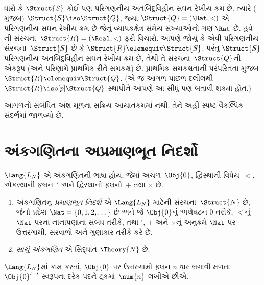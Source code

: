 \begin{rem}
  ધારો કે $\Struct{S}$ કોઈ પણ પરિગણનીય અંતબિંદુવિહીન સઘન રેખીય
  ક્રમ છે. ત્યારે ( મુજબ) $\Struct{S} \iso
  \Struct{Q}$, જ્યાં $\Struct{Q} = (\Rat, <)$ એ પરિગણનીય સઘન
  રેખીય ક્રમ છે જેનું વ્યાપકક્ષેત્ર સંમેય સંખ્યાઓનો ગણ $\Rat$ છે. હવે
  ની સંરચના~$\Struct{R} = (\Real, <)$ ફરી
  વિચારો. આપણે જોયું કે એવી પરિગણનીય સંરચના~$\Struct{S}$
  છે કે $\Struct{R} \elemequiv \Struct{S}$. પરંતુ $\Struct{S}$
  પરિગણનીય અંતબિંદુવિહીન સઘન રેખીય ક્રમ છે, તેથી તે
  સંરચના~$\Struct{Q}$ની એકરૂપ (અને પરિણામે પ્રાથમિક રીતે સમકક્ષ)
  છે. પ્રાથમિક સમકક્ષતાની પરંપરિતતા મુજબ $\Struct{R} \elemequiv
  \Struct{Q}$. (એ જ આગળ-પાછળ દલીલથી $\Struct{R} \iso[p]
  \Struct{Q}$ સ્થાપીને આપણે આ સીધું પણ બતાવી શક્યા હોત.)
\end{rem}
\endgroup



\OLEndChapterHook


\begin{editorial}
આગળનો સંબંધિત અંશ મૂળના સક્રિય આયાતક્રમમાં નથી. તેને અહીં સ્પષ્ટ વૈકલ્પિક સંદર્ભમાં જાળવ્યો છે.
\end{editorial}
\begingroup
\makeatletter{}\makeatother

\section{અંકગણિતના અપ્રમાણભૂત નિદર્શો}
\label{guunit:OLP-0653}


\begin{defn}
$\Lang{L_N}$ એ અંકગણિતની ભાષા હોય,
જેમાં અચળ~$\Obj{0}$, દ્વિસ્થાની
વિધેય~$<$, એકસ્થાની ફલન~$\prime$
અને દ્વિસ્થાની ફલનો~$+$ તથા $\times$
છે.
\begin{enumerate}
\item અંકગણિતનું \emph{પ્રમાણભૂત નિદર્શ}
  એ $\Lang{L_N}$ માટેની સંરચના~$\Struct{N}$
  છે, જેનો પ્રદેશ
  $\Nat = \{ 0, 1, 2, \dots\}$ છે અને જે
  $\Obj{0}$નું અર્થઘટન $0$ તરીકે, $<$નું
  $\Nat$ પરના નાનાપણાના સંબંધ તરીકે,
  તથા $\prime$, $+$ અને $\times$નું
  અનુક્રમે $\Nat$ પર ઉત્તરગામી,
  સરવાળો અને ગુણાકાર તરીકે કરે છે.
\item \emph{સાચું અંકગણિત} એ
  સિદ્ધાંત $\Theory{N}$ છે.
\end{enumerate}
\end{defn}

$\Lang{L_N}$માં કામ કરતાં, $\Obj{0}$ પર
ઉત્તરગામી ફલન $n$ વાર લગાવી મળતા
$\Obj{0}^{\prime\dots\prime}$
સ્વરૂપના દરેક પદને ટૂંકમાં~$\num{n}$
લખીએ છીએ.

